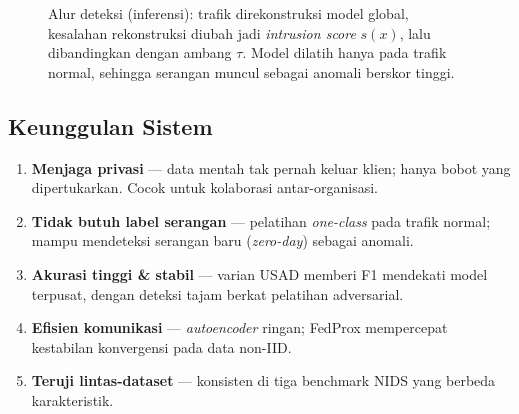 \documentclass[11pt,a4paper]{article}
\begin{document}
\begin{figure}[h]
\centering
{}
\caption{Alur deteksi (inferensi): trafik direkonstruksi model global, kesalahan
rekonstruksi diubah jadi \emph{intrusion score} $s(x)$, lalu dibandingkan dengan
ambang $\tau$. Model dilatih hanya pada trafik normal, sehingga serangan muncul
sebagai anomali berskor tinggi.}
\label{fig:deteksi}
\end{figure}

\subsection{Keunggulan Sistem}
\begin{enumerate}[leftmargin=1.4em]
  \item \textbf{Menjaga privasi} --- data mentah tak pernah keluar klien; hanya
  bobot yang dipertukarkan. Cocok untuk kolaborasi antar-organisasi.
  \item \textbf{Tidak butuh label serangan} --- pelatihan \emph{one-class} pada
  trafik normal; mampu mendeteksi serangan baru (\emph{zero-day}) sebagai
  anomali.
  \item \textbf{Akurasi tinggi \& stabil} --- varian USAD memberi F1 mendekati
  model terpusat, dengan deteksi tajam berkat pelatihan adversarial.
  \item \textbf{Efisien komunikasi} --- \emph{autoencoder} ringan; FedProx
  mempercepat kestabilan konvergensi pada data non-IID.
  \item \textbf{Teruji lintas-dataset} --- konsisten di tiga benchmark NIDS
  yang berbeda karakteristik.
\end{enumerate}
\end{document}
